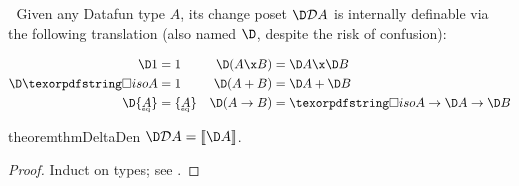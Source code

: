\documentclass[nomarginums]{rntz}\usepackage[tablet]{fantasy}%
\begin{document}

Given any Datafun type $A$, its change poset $\D\incdens A$ is internally
definable via the following translation (also named $\D$, despite the risk of
confusion):

\begin{align*}
  \D\tunit &= \tunit
  & \D(A \x B) &= \D A \x \D B
  \\
  \D \isof A &= \tunit
  & \D(A + B) &= \D A + \D B
  \\
  \D\tset{\eqt A} &= \tset{\eqt A}
  & \D(A \to B) &= \isof A \to \D A \to \D B
\end{align*}

\begin{restatable}{theorem}{thmDeltaDen}
  \label{thm:delta-den}
  \(\D\incdens A = \den{\D A}\).
\end{restatable}
\begin{proof}
  Induct on types; see .
\end{proof}


\end{document}
